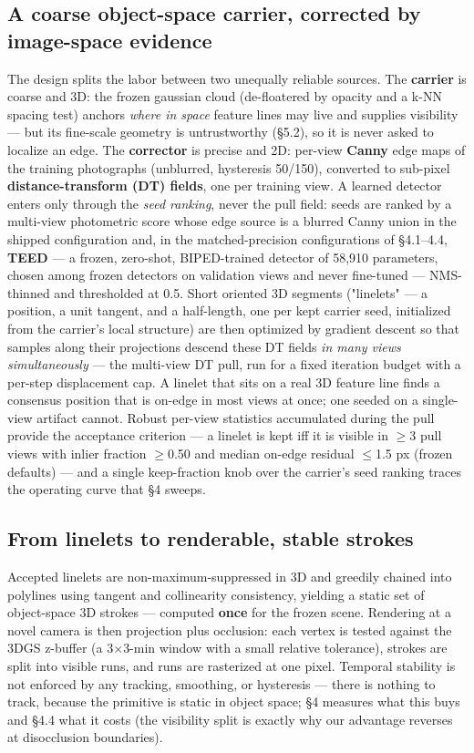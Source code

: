 \subsection{A coarse object-space carrier, corrected by image-space evidence}
The design splits the labor between two unequally reliable sources. The \textbf{carrier} is
coarse and 3D: the frozen gaussian cloud (de-floatered by opacity and a k-NN spacing
test) anchors \emph{where in space} feature lines may live and supplies visibility --- but its
fine-scale geometry is untrustworthy (\S5.2), so it is never asked to localize an edge.
The \textbf{corrector} is precise and 2D: per-view \textbf{Canny} edge maps of the training
photographs (unblurred, hysteresis 50/150), converted to sub-pixel \textbf{distance-transform
(DT) fields}, one per training view. A learned detector enters only through the \emph{seed
ranking}, never the pull field: seeds are ranked by a multi-view photometric score whose
edge source is a blurred Canny union in the shipped configuration and, in the
matched-precision configurations of \S4.1--4.4, \textbf{TEED} --- a frozen, zero-shot,
BIPED-trained detector of 58,910 parameters, chosen among frozen detectors on validation
views and never fine-tuned --- NMS-thinned and thresholded at 0.5. Short oriented 3D segments ("linelets" --- a position, a unit tangent, and a half-length,
one per kept carrier seed, initialized from the carrier's local structure) are then
optimized by gradient descent so that samples along their projections descend these DT
fields \emph{in many views simultaneously} --- the multi-view DT pull, run for a fixed iteration
budget with a per-step displacement cap. A linelet that sits on a real 3D feature
line finds a consensus position that is on-edge in most views at once; one seeded on a
single-view artifact cannot. Robust per-view statistics accumulated during the pull provide the acceptance
criterion --- a linelet is kept iff it is visible in $\geq$3 pull views with inlier fraction
$\geq$0.50 and median on-edge residual $\leq$1.5 px (frozen defaults) --- and a single keep-fraction
knob over the carrier's seed ranking traces the operating curve that \S4 sweeps.

\subsection{From linelets to renderable, stable strokes}
Accepted linelets are non-maximum-suppressed in 3D and greedily chained into polylines
using tangent and collinearity consistency, yielding a static set of object-space 3D
strokes --- computed \textbf{once} for the frozen scene. Rendering at a novel camera is then
projection plus occlusion: each vertex is tested against the 3DGS z-buffer (a 3$\times$3-min
window with a small relative tolerance), strokes are split into visible runs, and runs
are rasterized at one pixel. Temporal stability is not enforced by any tracking,
smoothing, or hysteresis --- there is nothing to track, because the primitive is static in
object space; \S4 measures what this buys and \S4.4 what it costs (the visibility split is
exactly why our advantage reverses at disocclusion boundaries).

